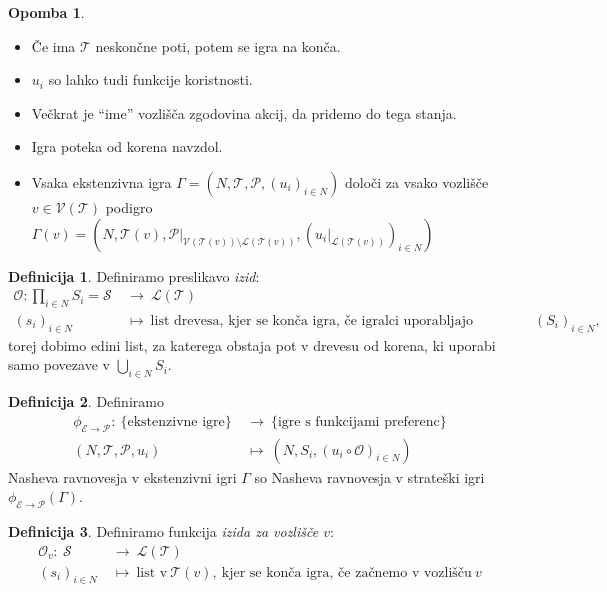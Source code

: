 \documentclass[11pt]{article}
\renewcommand{\S}{\mathscr{S}}
\newcommand{\set}[1]{\{#1\}}
\renewcommand{\P}{\mathcal{P}}
\renewcommand{\O}{\mathcal{O}}
\newcommand{\TT}{\mathcal{T}}
\newcommand{\V}{\mathscr{V}}
\renewcommand{\L}{\mathscr{L}}
\newcommand{\1}{\mathbbm{1}}
\newcommand{\eks}{\mathscr{E}}
\newcommand{\pref}{\mathscr{P}}
\theoremstyle{definition}
\newtheorem{definicija}{Definicija}[section]
\theoremstyle{definition}
\theoremstyle{definition}
\theoremstyle{definition}
\newtheorem*{opomba}{Opomba}
\begin{document}
\begin{opomba}
~
\begin{itemize}
	\item Če ima $\TT$ neskončne poti, potem se igra na konča.
	\item $u_i$ so lahko tudi funkcije koristnosti.
	\item Večkrat je ``ime'' vozlišča zgodovina akcij, da pridemo do tega stanja.
	\item Igra poteka od korena navzdol.
	\item Vsaka ekstenzivna igra $\Gamma = (N, \TT, \P, (u_i)_{i \in N})$ določi za vsako vozlišče $v \in \V(\TT)$ podigro $\Gamma(v) = (N, \TT(v), \P\big|_{\V(\TT(v))\setminus\L(\TT(v))}, (u_i\big|_{\L(\TT(v))})_{i \in N})$
\end{itemize}

\end{opomba}
\vspace{0.5cm}

\begin{definicija}

Definiramo preslikavo \textit{izid}:
\begin{align*}
\O: \prod_{i \in N}S_i = \S ~&\rightarrow~ \L(\TT) \\
(s_i)_{i \in N} ~&\mapsto~ \text{list drevesa, kjer se konča igra, če igralci uporabljajo strategije}~ (S_i)_{i \in N},
\end{align*}
torej dobimo edini list, za katerega obstaja pot v drevesu od korena, ki uporabi samo povezave v $\bigcup_{i \in N} S_i$.

\end{definicija}
\vspace{0.5cm}

\begin{definicija}

Definiramo
\begin{align*}
\phi_{\eks\rightarrow\pref}: ~\set{\text{ekstenzivne igre}} ~&\rightarrow~ \set{\text{igre s funkcijami preferenc}} \\
(N, \TT, \P, u_i) ~&\mapsto~ (N, S_i, (u_i \circ \O)_{i \in N})
\end{align*}
Nasheva ravnovesja v ekstenzivni igri $\Gamma$ so Nasheva ravnovesja v strateški igri $\phi_{\eks\rightarrow\pref}(\Gamma)$.

\end{definicija}
\vspace{0.5cm}

\begin{definicija}

Definiramo funkcija \textit{izida za vozlišče $v$}:
\begin{align*}
\O_v: ~\S ~&\rightarrow~ \L(\TT) \\
(s_i)_{i \in N} ~&\mapsto~ \text{list v}~\TT(v),~\text{kjer se konča igra, če začnemo v vozlišču}~v
\end{align*}

\end{definicija}
\vspace{0.5cm}
\end{document}
